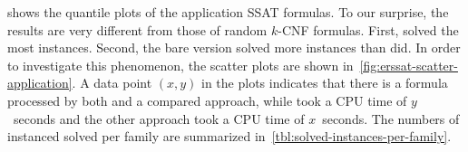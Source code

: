  shows the quantile plots of the application SSAT formulas.
To our surprise, the results are very different from those of random $k$-CNF formulas.
First, \dcssat solved the most instances.
Second, the bare version \erssatb solved more instances than \erssat did.
In order to investigate this phenomenon,
the scatter plots are shown in~\cref{fig:erssat-scatter-application}.
A data point $(x,y)$ in the plots indicates that there is a formula processed by both \erssat and a compared approach,
while \erssat took a CPU time of $y$~seconds and the other approach took a CPU time of $x$~seconds.
The numbers of instanced solved per family are summarized in~\cref{tbl:solved-instances-per-family}.